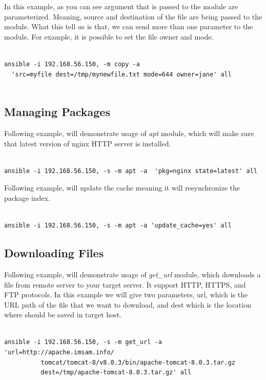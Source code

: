 \documentclass[10pt]{book}
\begin{document}
In this example, as you can see argument that is passed to the module are parameterized. Meaning, source and 
destination of the file are being passed to the module. What this tell us is 
that, we can send more than one parameter to the module. For example, it is 
possible to set the file owner and mode.

\begin{Verbatim}

ansible -i 192.168.56.150, -m copy -a  
  'src=myfile dest=/tmp/mynewfile.txt mode=644 owner=jane' all
  
\end{Verbatim}

\subsection{Managing Packages}
Following example, will demonstrate usage of \emph{apt} module, which will 
make sure that latest version of nginx HTTP server is installed.

\begin{Verbatim}

ansible -i 192.168.56.150, -s -m apt -a  'pkg=nginx state=latest' all

\end{Verbatim}

Following example, will update the cache meaning it will resynchronize the package 
index.

\begin{Verbatim}

ansible -i 192.168.56.150, -s -m apt -a 'update_cache=yes' all

\end{Verbatim}

\subsection{Downloading Files}
Following example, will demonstrate usage of \emph{get\_url} module, which downloads a file 
from remote server to your target server. It support HTTP, HTTPS, and FTP 
protocols. In this example we will give two parameters, url, which is the URL 
path of the file that we want to download, and dest which is the location where 
should be saved in target host.


\begin{Verbatim}

ansible -i 192.168.56.150, -s -m get_url -a 'url=http://apache.imsam.info/
          tomcat/tomcat-8/v8.0.3/bin/apache-tomcat-8.0.3.tar.gz 
          dest=/tmp/apache-tomcat-8.0.3.tar.gz' all

\end{Verbatim}
\end{document}

